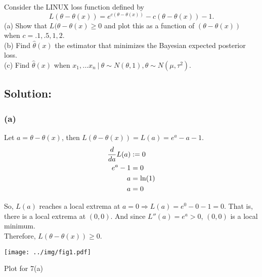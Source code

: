 \def\mya{\theta-\theta(x)}

Consider the LINUX loss function defined by 
\[
  L(\mya) = e^{c(\mya)} - c(\mya) - 1.
\]
(a) Show that $L(\mya \ge 0 $ and plot this as a function of $(\mya)$ when $c= .1, .5, 1, 2$.\\
(b) Find $\hat\theta(x)$ the estimator that minimizes the Bayesian expected posterior loss.\\
(c) Find $\hat\theta(x)$ when $x_1,...x_n~|~\theta \sim N(\theta,1), \theta \sim N(\mu,\tau^2)$.

\subsection*{Solution:}
\subsubsection*{(a)}
Let $a = \mya$, then $L(\mya) = L(a) = e^a - a - 1$. 
\begin{align*}
  \displaystyle\frac{d}{d a} L(a) &:= 0 \\
  e^a - 1 &= 0 \\
  a &= \ln(1) \\
  a &= 0 \\
\end{align*}

\noindent
So, $L(a)$ reaches a local extrema at $a=0 \Rightarrow L(a) = e^0 - 0 - 1 = 0$. 
That is, there is a local extrema at $(0,0)$.
And since $L''(a) = e^a > 0$, $(0,0)$ is a local minimum.\\

\noindent
Therefore, $L(\mya) \geq 0$.

\beginmyfig
\texttt{[image: ../img/fig1.pdf]}
\caption{Plot for 7(a)}
\endmyfig

